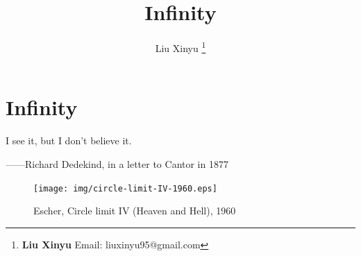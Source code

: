 \documentclass{article}
\begin{document}
\title{Infinity}

\author{Liu Xinyu
\thanks{{\bfseries Liu Xinyu} \newline
  Email: liuxinyu95@gmail.com \newline}
  }

\maketitle
\fi


\ifx\wholebook\relax
\chapter{Infinity}
\fi

\epigraph{I see it, but I don't believe it.}{——Richard Dedekind, in a letter to Cantor in 1877}


\begin{figure}
 \centering
 \texttt{[image: img/circle-limit-IV-1960.eps]}
 \captionsetup{labelformat=empty}
 \caption{Escher, Circle limit IV (Heaven and Hell), 1960}
 \label{fig:Circle-Limit-IV}
\end{figure}
\end{document}
